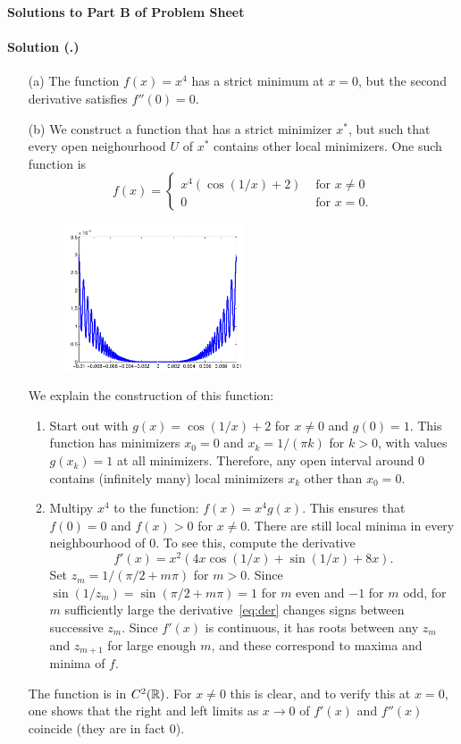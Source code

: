 \documentclass{article}
\newcounter{problemSheetNumber}
\newcounter{problems}
\renewcommand{\solution}[1]{\paragraph{Solution (\theproblemSheetNumber.\theproblems)}\addtocounter{problems}{1}\label{#1}}
\begin{document}
 
\begin{center}
{\Large {\bf Solutions to Part B of Problem Sheet \theproblemSheetNumber}}
\end{center}

\solution{pr:1}
\begin{itemize}
 \item[(a)] The function $f(x)=x^4$ has a strict minimum at $x=0$, but the second derivative satisfies $f''(0)=0$. 
 \item[(b)] We construct a function that has a strict minimizer $x^*$, but such that every open neighourhood $U$ of $x^*$ contains other local minimizers. One such function is
 \begin{equation*}
  f(x) = \begin{cases} x^4 (\cos(1/x)+2) & \text{ for } x\neq 0\\
          0 & \text{ for } x=0.
         \end{cases}
 \end{equation*}

\begin{figure}[h!]
\centering
 \includegraphics[width=0.5\textwidth]{images/strictmin_cropped.pdf}
\end{figure}
We explain the construction of this function:
\begin{enumerate}
 \item Start out with $g(x) = \cos(1/x)+2$ for $x\neq 0$ and $g(0)=1$. This function has minimizers $x_0=0$ and $x_k = 1/(\pi k)$ for $k>0$, with values $g(x_k)=1$ at all minimizers. Therefore, any open interval around $0$ contains (infinitely many) local minimizers $x_k$ other than $x_0=0$. 
 \item Multipy $x^4$ to the function: $f(x) = x^4g(x)$. This ensures that $f(0)=0$ and $f(x)>0$ for $x\neq 0$. There are still local minima in every neighbourhood of $0$. To see this, compute the derivative
 \begin{equation}\label{eq:der}\tag{1}
  f'(x) = x^2(4x\cos(1/x)+\sin(1/x)+8x).
 \end{equation}
 Set $z_m=1/(\pi/2+m\pi)$ for $m>0$. Since $\sin(1/z_m)=\sin(\pi/2+m\pi)= 1$ for $m$ even and $-1$ for $m$ odd, for $m$ sufficiently large the derivative~\eqref{eq:der} changes signs between successive $z_m$. Since $f'(x)$ is continuous, it has roots between any $z_m$ and $z_{m+1}$ for large enough $m$, and these correspond to maxima and minima of $f$.
\end{enumerate}
The function is in $C^2(\mathbb{R})$. For $x\neq 0$ this is clear, and to verify this at $x=0$, one shows that the right and left limits as $x\to 0$ of $f'(x)$ and $f''(x)$ coincide (they are in fact $0$).


\end{itemize}
\end{document}
